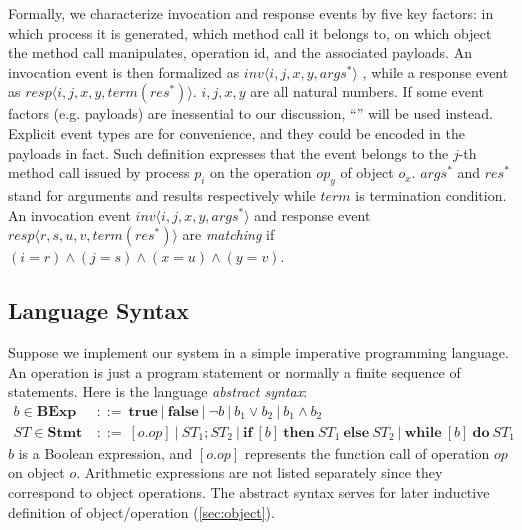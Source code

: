 \documentclass[a4paper,USenglish]{lipics-v2016}
\begin{document}
Formally, we characterize invocation and response events by five key factors:
in which process it is generated, which method call it belongs to,
on which object the method call manipulates, operation id, and the associated payloads.
An invocation event is then formalized as $inv \langle i, j, x, y, args^\ast \rangle $
, while a response event as $resp \langle i, j, x, y, term(res^\ast) \rangle $.
$i, j, x, y$ are all natural numbers.
If some event factors (e.g. payloads) are inessential to our discussion,
``\textunderscore'' will be used instead.
Explicit event types are for convenience, and they could be encoded in the payloads in fact.
Such definition expresses that the event belongs to the $j$-th method call
issued by process $p_i$ on the operation $op_y$ of object $o_x$.
$args^\ast$ and $res^\ast$ stand for arguments and results respectively
while $term$ is termination condition.
An invocation event $inv \langle i, j, x, y, args^\ast \rangle$ and response event $resp \langle r, s, u, v, term(res^\ast) \rangle$
are \textit{matching} if $(i = r) \land (j = s) \land (x = u) \land (y = v)$.

\subsection{Language Syntax}\label{sec:syntax}
Suppose we implement our system in a simple imperative programming language.
An operation is just a program statement or normally a finite sequence of statements.
Here is the language \textit{abstract syntax}:
		\begin{align*}
		b \in \textbf{BExp} \ &::= \ \textbf{true} \ | \ \textbf{false} \ | \ \neg b \ | \ b_1 \lor b_2 \ | \ b_1 \land b_2\\
		ST \in \textbf{Stmt} \ &::= \ [o.op] \ | \ ST_1;ST_2 \ | \ \textbf{if} \ [b] \ \textbf{then} \ ST_1 \ \textbf{else} \ ST_2  \ | \ \textbf{while} \ [b] \ \textbf{do} \ ST_1
		\end{align*}
$b$ is a Boolean expression, and $[o.op]$ represents the function call of operation $op$ on object $o$.
Arithmetic expressions are not listed separately since they correspond to object operations.
The abstract syntax serves for later inductive definition of object/operation (\ref{sec:object}).
\end{document}
